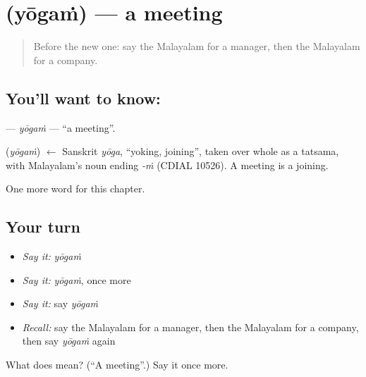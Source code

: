 \section[\texorpdfstring{\ml{യോഗം} (yōgaṁ)}{യോഗം (yōgaṁ)}]{ (yōgaṁ) — a meeting}

\label{lesson:ML-C334-yogam}



\begin{quote}
Before the new one: say the Malayalam for a manager, then the Malayalam for a company.
\end{quote}

\subsection*{You'll want to know: }
\textbf{} — \emph{yōgaṁ} — \textquotedblleft{}a meeting\textquotedblright{}.

\begin{cousinweb}
\textbf{} (\emph{yōgaṁ}) $\leftarrow$ Sanskrit \emph{yōga}, \textquotedblleft{}yoking, joining\textquotedblright{}, taken over whole as a tatsama, with Malayalam's noun ending \emph{-ṁ} (CDIAL 10526). A meeting is a joining.
\end{cousinweb}

\begin{grammarlens}[title={What you've built}]
One more word for this chapter.
\end{grammarlens}

\subsection*{Your turn}
\begin{itemize}
\raggedright
  \item \emph{Say it:} \emph{yōgaṁ}
  \item \emph{Say it:} \emph{yōgaṁ}, once more
  \item \emph{Say it:} say \emph{yōgaṁ}
  \item \emph{Recall:} say the Malayalam for a manager, then the Malayalam for a company, then say \emph{yōgaṁ} again
\end{itemize}

\begin{tcolorbox}[breakable,colback=teal!4,colframe=teal!35!black,title={Before you move on}]
What does  mean? (\textquotedblleft{}A meeting\textquotedblright{}.) Say it once more.
\end{tcolorbox}
